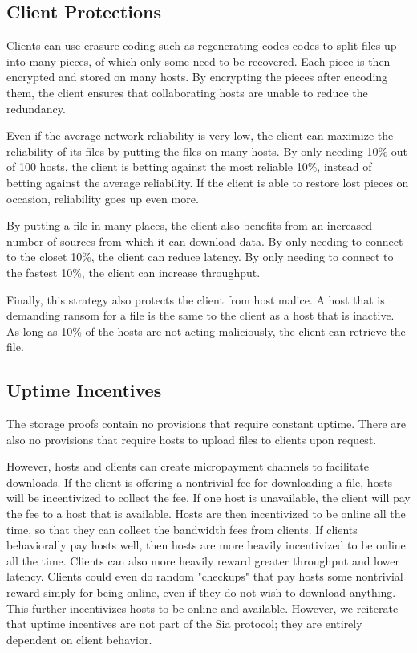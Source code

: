 \documentclass[twocolumn]{article}
\begin{document}
\subsection{Client Protections}
Clients can use erasure coding such as regenerating codes \cite{reg} codes to split files up into many pieces, of which only some need to be recovered.
Each piece is then encrypted and stored on many hosts.
By encrypting the pieces after encoding them, the client ensures that collaborating hosts are unable to reduce the redundancy.

Even if the average network reliability is very low, the client can maximize the reliability of its files by putting the files on many hosts.
By only needing 10\% out of 100 hosts, the client is betting against the most reliable 10\%, instead of betting against the average reliability.
If the client is able to restore lost pieces on occasion, reliability goes up even more.

By putting a file in many places, the client also benefits from an increased number of sources from which it can download data.
By only needing to connect to the closet 10\%, the client can reduce latency.
By only needing to connect to the fastest 10\%, the client can increase throughput.

Finally, this strategy also protects the client from host malice.
A host that is demanding ransom for a file is the same to the client as a host that is inactive.
As long as 10\% of the hosts are not acting maliciously, the client can retrieve the file.

\subsection{Uptime Incentives}
The storage proofs contain no provisions that require constant uptime.
There are also no provisions that require hosts to upload files to clients upon request.

However, hosts and clients can create micropayment channels to facilitate downloads.
If the client is offering a nontrivial fee for downloading a file, hosts will be incentivized to collect the fee.
If one host is unavailable, the client will pay the fee to a host that is available.
Hosts are then incentivized to be online all the time, so that they can collect the bandwidth fees from clients.
If clients behaviorally pay hosts well, then hosts are more heavily incentivized to be online all the time.
Clients can also more heavily reward greater throughput and lower latency.
Clients could even do random "checkups" that pay hosts some nontrivial reward simply for being online, even if they do not wish to download anything.
This further incentivizes hosts to be online and available.
However, we reiterate that uptime incentives are not part of the Sia protocol; they are entirely dependent on client behavior.
\end{document}

